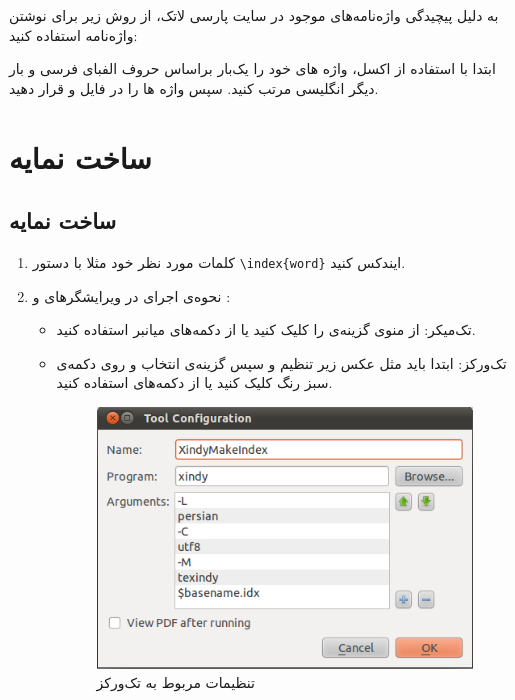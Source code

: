 به دلیل پیچیدگی واژه‌نامه‌های موجود در سایت پارسی لاتک، از روش زیر برای نوشتن واژه‌نامه استفاده کنید:

ابتدا با استفاده از اکسل، واژه های خود را یک‌بار براساس حروف الفبای فرسی و بار دیگر انگلیسی مرتب کنید. سپس واژه ها را در فایل  و  قرار دهید.

\section{ساخت نمایه}\label{Namaye}
\subsection{ساخت نمایه}
 \begin{enumerate}

\item
کلمات مورد نظر خود مثلا  با دستور \verb|\index{word}| ایندکس کنید.
\item
نحوه‌ی اجرای    در ویرایشگرهای  و :
\begin{itemize}
\item  تک‌میکر: از منوی  گزینه‌ی  را کلیک کنید یا از دکمه‌‌های میانبر  استفاده کنید.

\item  تک‌ورکز: ابتدا باید مثل عکس زیر تنظیم  و سپس گزینه‌ی   انتخاب و روی دکمه‌ی سبز رنگ کلیک کنید یا از دکمه‌های   استفاده کنید.

\begin{figure}[!h]
\centerline{\includegraphics[width=.5\textwidth]{Images/Chapter2/Xindy_Make_Index.png}}
\caption{تنظیمات مربوط به تک‌ورکز}
\end{figure}

\end{itemize}
 \end{enumerate}
 
